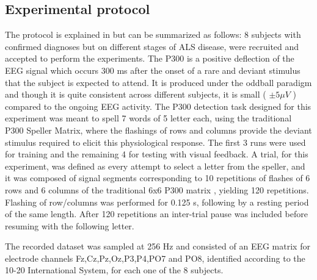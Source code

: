 \documentclass[entropy,article,submit,moreauthors,pdftex,10pt,a4paper]{mdpi}
\begin{document}
\subsection{Experimental protocol}

The protocol is explained in \citep{Riccio2013} but can be summarized as follows:  8 subjects with confirmed diagnoses but on different stages of ALS disease, were recruited and accepted to perform the experiments. The P300 \citep{Knuth2006} is a positive deflection of the EEG signal which occurs 300 ms after the onset of a rare and deviant stimulus that the subject is expected to attend.  It is produced under the oddball paradigm \cite{WolpawJonathanR2012} and though it is quite consistent across different subjects, it is small ( $ \pm 5 \mu V $ ) compared to the ongoing EEG activity.  The P300 detection task designed for this experiment was meant to spell 7 words of 5 letter each, using the traditional P300 Speller Matrix, where the flashings of rows and columns provide the deviant stimulus required to elicit this physiological response.  The first 3 runs were used for training and the remaining 4 for testing with visual feedback.  A trial, for this experiment, was defined as every attempt to select a letter from the speller, and it was composed of signal segments corresponding to 10 repetitions of flashes of 6 rows and 6 columns of the traditional 6x6 P300 matrix , yielding 120 repetitions.  Flashing of row/columns was performed for 0.125 s, following by a resting period of the same length.  After 120 repetitions an inter-trial pause was included before resuming with the following letter.

The recorded dataset was sampled at 256 Hz and consisted of an EEG matrix for electrode channels Fz,Cz,Pz,Oz,P3,P4,PO7 and PO8, identified according to the 10-20 International System,  for each one of the 8 subjects.  


%
%
%
%
%
%
%
%
\end{document}
